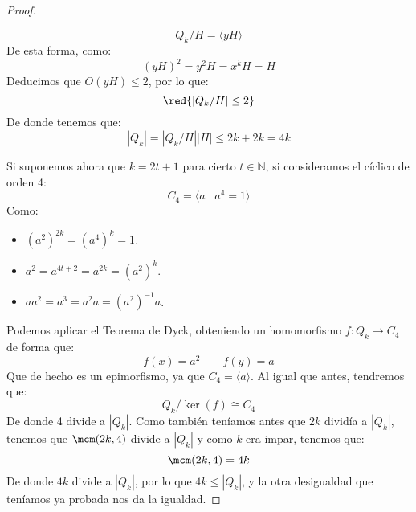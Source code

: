 \begin{ejemplo}
\begin{itemize}
\begin{proof}
\begin{itemize}
\begin{equation*}
                            Q_k/H = \langle yH \rangle 
                        \end{equation*}
                        De esta forma, como:
                        \begin{equation*}
                            {(yH)}^{2} = y^2H = x^k H = H
                        \end{equation*}
                        Deducimos que $O(yH) \leq 2$, por lo que:
                        \begin{equation*}
                            \red{|Q_k/H| \leq 2}
                        \end{equation*}
                        De donde tenemos que:
                        \begin{equation*}
                            |Q_k| = |Q_k/H| |H| \leq 2k + 2k = 4k
                        \end{equation*}
                \end{itemize}

                Si suponemos ahora que $k = 2t + 1$ para cierto $t\in \mathbb{N}$, si consideramos el cíclico de orden 4:
                \begin{equation*}
                    C_4 = \langle a \mid a^4 = 1 \rangle 
                \end{equation*}
                Como:
                \begin{itemize}
                    \item ${(a^2)}^{2k} = {(a^4)}^{k} = 1$.
                    \item $a^2 = a^{4t+2} = a^{2k} = {(a^2)}^{k}$.
                    \item $aa^2 = a^3 = a^2a = {(a^2)}^{-1}a$.
                \end{itemize}
                Podemos aplicar el Teorema de Dyck, obteniendo un homomorfismo $f:Q_k\to C_4$ de forma que:
                \begin{equation*}
                    f(x) = a^2 \qquad f(y) = a
                \end{equation*}
                Que de hecho es un epimorfismo, ya que $C_4 = \langle a \rangle $. Al igual que antes, tendremos que:
                \begin{equation*}
                    Q_k/\ker(f)\cong C_4
                \end{equation*}
                De donde 4 divide a $|Q_k|$. Como también teníamos antes que $2k$ dividía a $|Q_k|$, tenemos que $\mcm(2k,4)$ divide a $|Q_k|$ y como $k$ era impar, tenemos que:
                \begin{equation*}
                    \mcm(2k,4) = 4k
                \end{equation*}
                De donde $4k$ divide a $|Q_k|$, por lo que $4k\leq |Q_k|$, y la otra desigualdad que teníamos ya probada nos da la igualdad.
            \end{proof}
    \end{itemize}
\end{ejemplo}

